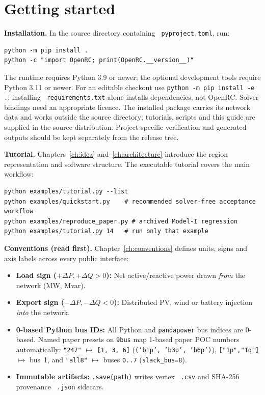\documentclass[11pt,a4paper]{report}
\newcommand{\code}[1]{\texttt{\small #1}}
\newcommand{\file}[1]{\texttt{\small\color{nbgrey} #1}}
\begin{document}
\chapter*{Getting started}

\textbf{Installation.} In the source directory containing
\file{pyproject.toml}, run:

\begin{lstlisting}[style=sh]
python -m pip install .
python -c "import OpenRC; print(OpenRC.__version__)"

\end{lstlisting}

The runtime requires Python 3.9 or newer; the optional development tools require
Python 3.11 or newer. For an editable checkout use
\code{python -m pip install -e .}; installing \file{requirements.txt} alone
installs dependencies, not OpenRC. Solver bindings need an appropriate licence.
The installed package carries its network data and works outside the source
directory; tutorials, scripts and this guide are supplied in the source
distribution. Project-specific verification and generated outputs should be
kept separately from the release tree.

\medskip
\noindent
\textbf{Tutorial.} Chapters~\ref{ch:idea} and~\ref{ch:architecture} introduce
the region representation and software structure. The executable tutorial
covers the main workflow:

\begin{lstlisting}[style=sh]
python examples/tutorial.py --list
python examples/quickstart.py    # recommended solver-free acceptance workflow
python examples/reproduce_paper.py # archived Model-I regression
python examples/tutorial.py 14   # run only that example
\end{lstlisting}

\noindent
\textbf{Conventions (read first).} Chapter~\ref{ch:conventions} defines units,
signs and axis labels across every public interface:
\begin{notebox}
\small
\begin{itemize}
  \item \textbf{Load sign ($+\Delta P, +\Delta Q > 0$):} Net active/reactive power drawn \emph{from} the network (MW, Mvar).
  \item \textbf{Export sign ($-\Delta P, -\Delta Q < 0$):} Distributed PV, wind or battery injection \emph{into} the network.
  \item \textbf{0-based Python bus IDs:} All Python and \code{pandapower} bus indices are 0-based. Named paper presets on \code{9bus} map 1-based paper POC numbers automatically: \code{"247"} $\mapsto$ \code{[1, 3, 6]} (\code{('b1p', 'b3p', 'b6p')}), \code{["1p","1q"]} $\mapsto$ bus~1, and \code{"all8"} $\mapsto$ buses \code{0..7} (\code{slack\_bus=8}).
  \item \textbf{Immutable artifacts:} \code{.save(path)} writes vertex \file{.csv} and SHA-256 provenance \file{.json} sidecars.
\end{itemize}
\end{notebox}
\end{document}

